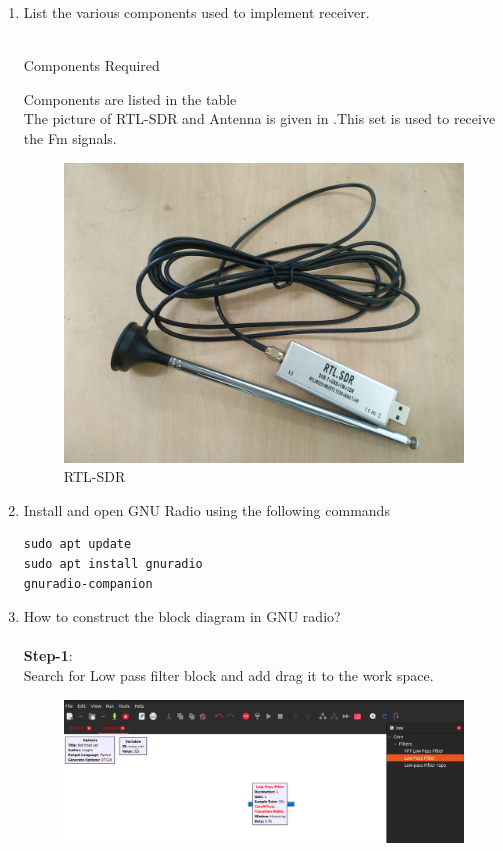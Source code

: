 \begin{enumerate}[label=\arabic*.,ref=\thesection.\theenumi]
\item List the various components used to implement receiver.
\\
\solution
\\
\begin{table}[!ht]
  \centering
  
  \caption{Components Required}
  \label{tab:components}
\end{table}
Components are listed in the table \\
The picture of RTL-SDR and Antenna is given in .This set is used to receive the Fm signals.
\begin{figure}[H]
\centering
\includegraphics[width=0.5\columnwidth]{fm/rx/figs/rtl-sdr.png}
\caption{RTL-SDR}
\label{fig:rtl-sdr}
\end{figure}
\item Install and open GNU Radio using the following commands
\\
\begin{lstlisting}
sudo apt update
sudo apt install gnuradio
gnuradio-companion
\end{lstlisting}
\item How to construct the block diagram in GNU radio? \\
	\solution  \\
\textbf{Step-1}:\\
Search for Low pass filter block and add drag it to the work space.
\begin{figure}[H]
\centering
\includegraphics[width=\columnwidth]{fm/rx/figs/add.png}

\end{figure}
\end{enumerate}
